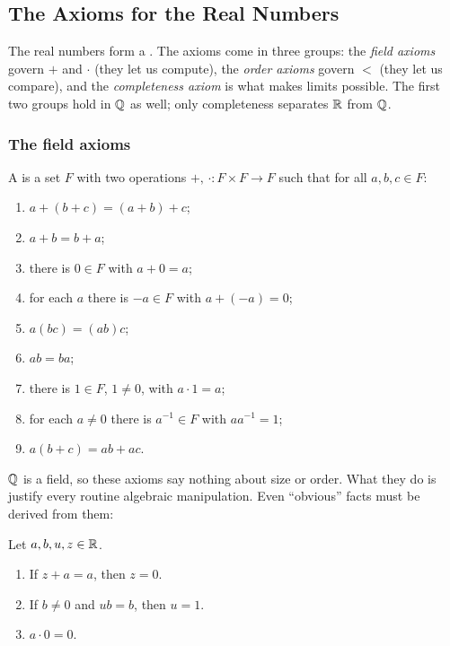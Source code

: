 \subsection{The Axioms for the Real Numbers}\label{sec:axioms}

The real numbers form a . The axioms come in
three groups: the \emph{field axioms} govern $+$ and $\cdot$ (they let us
compute), the \emph{order axioms} govern $<$ (they let us compare), and the
\emph{completeness axiom} is what makes limits possible. The first two
groups hold in $\mathbb{Q}$ as well; only completeness separates $\mathbb{R}$ from $\mathbb{Q}$.

\subsubsection{The field axioms}
\begin{definition}\label{def:field}
    A  is a set $F$ with two operations
    $+,\,\cdot : F \times F \to F$ such that for all $a,b,c \in F$:
    \begin{enumerate}[label=\textbf{F\arabic*.}, leftmargin=2.5em]
        \item $a + (b + c) = (a + b) + c$;
        \item $a + b = b + a$;
        \item there is $0 \in F$ with $a + 0 = a$;
        \item for each $a$ there is $-a \in F$ with $a + (-a) = 0$;
        \item $a (b c) = (a b) c$;
        \item $a b = b a$;
        \item there is $1 \in F$, $1 \neq 0$, with $a \cdot 1 = a$;
        \item for each $a \neq 0$ there is $a^{-1} \in F$ with $a a^{-1} = 1$;
        \item $a (b + c) = a b + a c$.
    \end{enumerate}
\end{definition}

$\mathbb{Q}$ is a field, so these axioms say nothing about size or order. What they
do is justify every routine algebraic manipulation. Even ``obvious'' facts
must be derived from them:

\begin{theorem}
    Let $a,b,u,z \in \mathbb{R}$.
    \begin{enumerate}[label=(\alph*)]
        \item If $z + a = a$, then $z = 0$.
        \item If $b \neq 0$ and $u b = b$, then $u = 1$.
        \item $a \cdot 0 = 0$.
    \end{enumerate}
\end{theorem}

